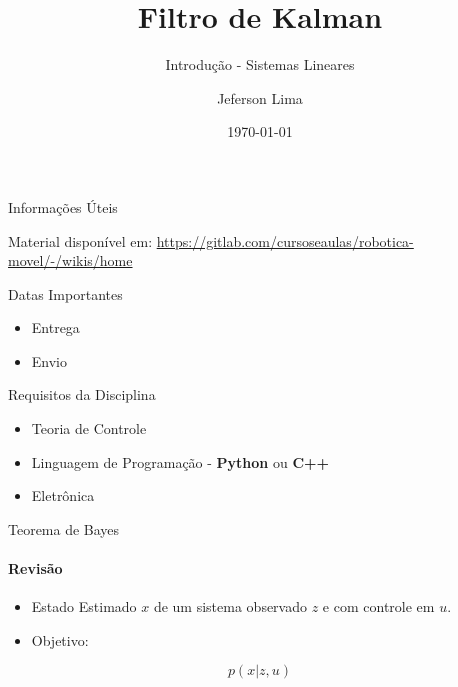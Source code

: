 \documentclass{beamer}
\title{Filtro de Kalman}
\subtitle{Introdução - Sistemas Lineares}
\date{\today}
\author{Jeferson Lima}
\institute{\url{http://gitlab.com/jeferson.lima}}
\newcommand{\pausar}{\pause}
\begin{document}
\maketitle

\begin{frame}{Informações Úteis}
	\begin{block}{Material disponível em:}
		\href{Robótica Móvel - Wiki}{https://gitlab.com/cursoseaulas/robotica-movel/-/wikis/home}
	\end{block}
	\pausar
	\begin{block}{Datas Importantes}
		\begin{itemize}
		\item Entrega
		\item Envio
		\end{itemize}
	\end{block}
	\pausar
	\begin{block}{Requisitos da Disciplina}
		\begin{itemize}
		\item Teoria de Controle
		\item Linguagem de Programação - \textbf{Python} ou \textbf{C++}
		\item Eletrônica
		\end{itemize}
	\end{block}
\end{frame}


\begin{frame}{Teorema de Bayes}
    \framesubtitle{Revisão}    
  \begin{itemize}
    \item Estado Estimado $x$ de um sistema observado $z$ e com controle em $u$.
    \item Objetivo:
  \end{itemize}

  \begin{equation}
    p(x|z,u)
  \end{equation}
\end{frame}
\end{document}
